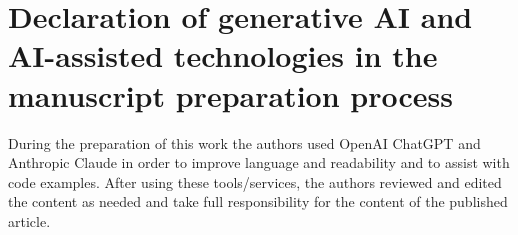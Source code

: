 \documentclass[preprint,12pt]{elsarticle}
\begin{document}
\section*{Declaration of generative AI and AI-assisted technologies in the manuscript preparation process}

During the preparation of this work the authors used OpenAI ChatGPT and Anthropic
Claude in order to improve language and readability and to assist with code examples.
After using these tools/services, the authors reviewed and edited the content as
needed and take full responsibility for the content of the published article.
 

\end{document}
